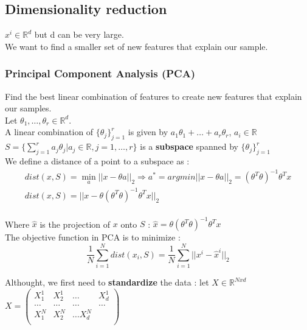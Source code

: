 \documentclass[../main.tex]{subfiles}
\begin{document}
\subsection{Dimensionality reduction}
$x^i \in \mathbb{R}^d$ but d can be very large.\\
We want to find a smaller set of new features that explain our sample.\\

\subsubsection{Principal Component Analysis (PCA)}
Find the best linear combination of features to create new features that explain our samples.\\

Let $\theta_1, \dots, \theta_r \in \mathbb{R}^d$.\\
A linear combination of $\{\theta_j\}_{j=1}^r$ is given by $a_1\theta_1 + \dots + a_r \theta_r$, $a_i \in \mathbb{R}$\\

$S=\{\sum_{j=1}^r a_j \theta_j \lvert a_j \in \mathbb{R}, j=1,\dots, r\}$ is a \textbf{subspace} spanned by $\{\theta_j\}_{j=1}^r$\\

We define a distance of a point to a subspace as : \begin{equation}
\begin{gathered}
    dist(x,S) = \min_a \lvert \lvert x-\theta a\rvert \rvert_2 \Rightarrow a^* = argmin\lvert \lvert x-\theta a\rvert \rvert_2 = (\theta^T\theta)^{-1}\theta^Tx\\
    dist(x,S) = \lvert \lvert x-\theta(\theta^T\theta)^{-1}\theta^Tx\rvert \rvert_2\\
    \end{gathered}
\end{equation}

Where $\hat{x}$ is the projection of $x$ onto $S$ : $\hat{x} = \theta(\theta^T\theta)^{-1}\theta^Tx$\\

The objective function in PCA is to minimize : \begin{equation}
    \frac{1}{N} \sum_{i=1}^N dist(x_i,S) = \frac{1}{N}\sum_{i=1}^N \lvert \lvert x^i-\hat{x}^i\rvert \rvert_2
\end{equation}

Althought, we first need to \textbf{standardize} the data : let $X \in \mathbb{R}^{Nxd}$\\
$X = \begin{pmatrix}
    X_1^1 & X_2^1 & \dots & X_d^1\\
    \dots & \dots & \dots & \dots\\
    X_1^N & X_2^N & \dots X_d^N\\
\end{pmatrix}$
\end{document}
